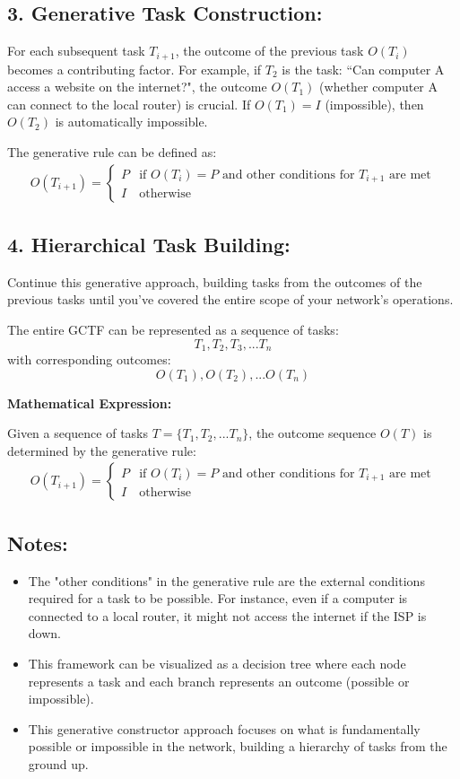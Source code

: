 \documentclass[sn-nature]{sn-jnl}%
\theoremstyle{thmstyleone}%
\theoremstyle{thmstyletwo}%
\theoremstyle{thmstylethree}%
\begin{document}
\subsection*{3. Generative Task Construction:}
For each subsequent task $T_{i+1}$, the outcome of the previous task $O(T_i)$ becomes a contributing factor. 
For example, if $T_2$ is the task: ``Can computer A access a website on the internet?", the outcome $O(T_1)$ (whether computer A can connect to the local router) is crucial. If $O(T_1) = I$ (impossible), then $O(T_2)$ is automatically impossible.

The generative rule can be defined as:
\begin{align*}
O(T_{i+1}) = 
  \begin{cases} 
    P & \text{if } O(T_i) = P \text{ and other conditions for } T_{i+1} \text{ are met} \\
    I & \text{otherwise}
  \end{cases}
\end{align*}

\subsection*{4. Hierarchical Task Building:}
Continue this generative approach, building tasks from the outcomes of the previous tasks until you've covered the entire scope of your network's operations.

The entire GCTF can be represented as a sequence of tasks:
\[ T_1, T_2, T_3, ... T_n \]
with corresponding outcomes:
\[ O(T_1), O(T_2), ... O(T_n) \]

\textbf{Mathematical Expression:}

Given a sequence of tasks $T = \{T_1, T_2, ... T_n\}$, the outcome sequence $O(T)$ is determined by the generative rule:
\begin{align*}
O(T_{i+1}) = 
  \begin{cases} 
    P & \text{if } O(T_i) = P \text{ and other conditions for } T_{i+1} \text{ are met} \\
    I & \text{otherwise}
  \end{cases}
\end{align*}

\subsection*{Notes:}
\begin{itemize}
    \item The "other conditions" in the generative rule are the external conditions required for a task to be possible. For instance, even if a computer is connected to a local router, it might not access the internet if the ISP is down.
    \item This framework can be visualized as a decision tree where each node represents a task and each branch represents an outcome (possible or impossible).
    \item This generative constructor approach focuses on what is fundamentally possible or impossible in the network, building a hierarchy of tasks from the ground up.
\end{itemize}
\end{document}
